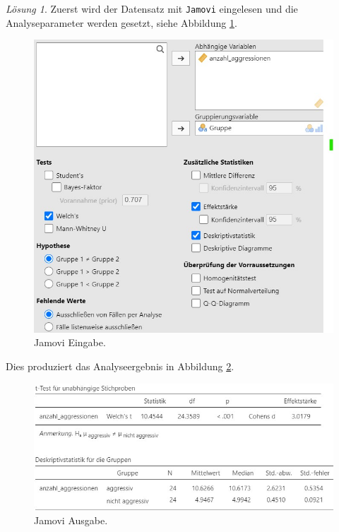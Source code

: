 \documentclass[
]{book}
\theoremstyle{definition}
\theoremstyle{definition}
\theoremstyle{definition}
\theoremstyle{definition}
\theoremstyle{remark}
\newtheorem*{solution}{Lösung}
\begin{document}
\begin{solution}

Zuerst wird der Datensatz mit \texttt{Jamovi} eingelesen und die Analyseparameter werden gesetzt, siehe Abbildung \ref{fig:sol-bobo2groups-input}.

\begin{figure}
\includegraphics[width=1\linewidth]{figures/06-exr-bobo2groups-jmv-input} \caption{Jamovi Eingabe.}\label{fig:sol-bobo2groups-input}
\end{figure}

Dies produziert das Analyseergebnis in Abbildung \ref{fig:sol-bobo2groups-output}.

\begin{figure}
\includegraphics[width=1\linewidth]{figures/06-exr-bobo2groups-jmv-output} \caption{Jamovi Ausgabe.}\label{fig:sol-bobo2groups-output}
\end{figure}


\end{solution}
\end{document}
